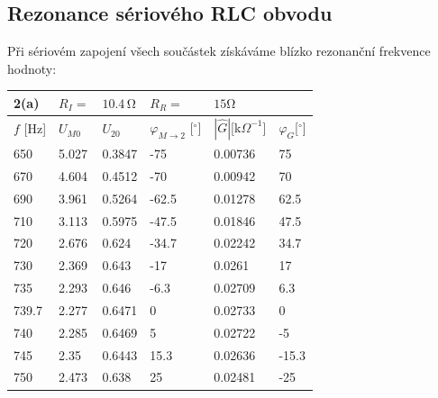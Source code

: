 \documentclass[czech,11pt,a4paper]{article}
\begin{document}
\begin{multicols}{2}
	\subsection{Rezonance sériového RLC obvodu}
	Při sériovém zapojení všech součástek získáváme blízko rezonanční frekvence hodnoty:\\
{\footnotesize \begin{tabular}{llllll}
			\hline
			2(a)     & $R_{I}= $	& $10.4 \,\mathrm{\Omega}$ & $R_{R}=	$			& $15 \mathrm{\Omega}$  &         \\ \hline
			$f$ [Hz] & $U_{M0}$ & $U_{20}$ & $\varphi_{M\rightarrow2}$ [$^\circ$] & $|\hat{G}|$[k$\Omega^{-1}$]& $\varphi_{G}$[$^\circ$] \\ \hline
			650      & 5.027    & 0.3847   & -75                                  & 0.00736                      & 75                       \\
			670      & 4.604    & 0.4512   & -70                                  & 0.00942                      & 70                       \\
			690      & 3.961    & 0.5264   & -62.5                                & 0.01278                      & 62.5                     \\
			710      & 3.113    & 0.5975   & -47.5                                & 0.01846                      & 47.5                     \\
			720      & 2.676    & 0.624    & -34.7                                & 0.02242                      & 34.7                     \\
			730      & 2.369    & 0.643    & -17                                  & 0.0261                       & 17                       \\
			735      & 2.293    & 0.646    & -6.3                                 & 0.02709                      & 6.3                      \\ \hline
			739.7    & 2.277    & 0.6471   & 0                                    & 0.02733                      & 0                        \\\hline
			740      & 2.285    & 0.6469   & 5                                    & 0.02722                      & -5                       \\
			745      & 2.35     & 0.6443   & 15.3                                 & 0.02636                      & -15.3                    \\
			750      & 2.473    & 0.638    & 25                                   & 0.02481                      & -25                      \\

\end{tabular}}
\end{multicols}
\end{document}
